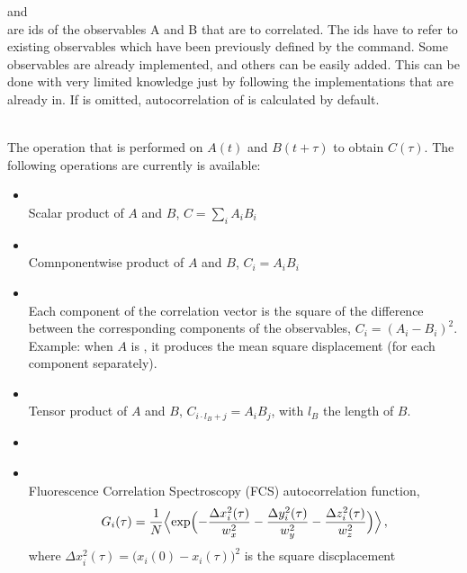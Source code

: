\begin{arguments}
\item {} and  \\ 
  are ids of the observables A and B that are to correlated. The ids have to refer to existing 
  observables which have been previously defined by the  command.
  Some observables are already implemented, and others can be easily added. This can be done
  with very limited \es{} knowledge just by following the implementations that are already
  in. If  is omitted, autocorrelation of  is calculated by default.
\item {} \\
  The operation that is performed on $A(t)$ and $B(t+\tau)$ to obtain $C(\tau)$. 
  The following operations are currently is available:
  \begin{itemize}
    \item {} \\
    Scalar product of $A$ and $B$, \ie $C=\sum\limits_{i} A_i B_i$
    \item {} \\
    Comnponentwise product of $A$ and $B$, \ie $C_i = A_i B_i$
    \item {} \\
    Each component of the correlation vector is the square of the difference between the 
    corresponding components of the observables, \ie $C_i = (A_i-B_i)^2$. 
    Example: when $A$ is , it produces the mean square displacement
    (for each component separately).
    \item {} \\
    Tensor product of $A$ and $B$, \ie $C_{i \cdot l_B + j} = A_i B_j$, with $l_B$ the length of $B$.
    \item {}
    \item {}    \\
    Fluorescence Correlation Spectroscopy (FCS) autocorrelation function, \ie
    \begin{equation}
    G_i(\tau) = \frac{1}{N} \Bigl< \exp \Bigl( - \frac{\Delta x_i^2(\tau) }{w_x^2} - \frac{\Delta y_i^2(\tau)}{w_y^2} - \frac{\Delta z_i^2(\tau)}{w_z^2} \Bigr) \Bigr>\,,
    \label{eq:Gtau}
    \end{equation}
    where $\Delta x_i^2(\tau) = \bigl(x_i(0) - x_i(\tau) \bigr)^2$ is the square discplacement 

\end{itemize}
\end{arguments}
